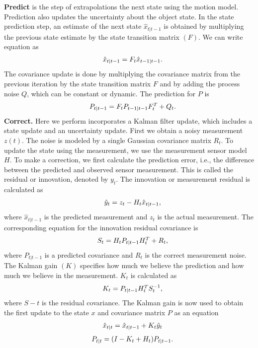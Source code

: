 \textbf{Predict} 
is the step of extrapolations the next state using the motion model. Prediction also updates the uncertainty about the object state.
In the state prediction step, an estimate of the next state $ \hat{x}_{t|t-1} $ is obtained by multiplying the previous state estimate by the state transition matrix $(F)$. We can write equation as 
\[
\begin{array}{lc}
{\rm } & {\hat{x}_{t|t-1}} = F_t \hat{x}_{t-1|t-1}.  
\end{array}
\]
The covariance update is done by multiplying the covariance matrix from the previous iteration by the state transition matrix $F$ and by adding the process noise $Q$, which can be constant or dynamic. The prediction for $P$ is
\[
\begin{array}{lc}
{\rm } & {P_{t|t-1}} = F_t P_{t-1|t-1} F_t^{T}+ Q_{t}.  
\end{array}
\]
\textbf{Correct.} Here we perform incorporates a Kalman filter update, which includes a state update and an uncertainty update. First we obtain a noisy measurement $z(t)$. The noise is modeled by a single Gaussian covariance matrix $R_t$. To update the state using the measurement, we use the measurement sensor model $H$. To make a correction, we first calculate the prediction error, i.e., the difference between the predicted and observed sensor measurement. This is called the residual or innovation, denoted by $y_t$. The innovation or measurement residual is calculated as
\[
\begin{array}{lc}
{\rm } & {\hat{y}_t = z_t - H_t \hat{x}_{t|t-1} ,} 
\end{array}
\]
where $\hat{x}_{t|t-1}$ is the predicted measurement and $z_t$ is the actual measurement. The corresponding equation for the innovation residual covariance is 
\[
\begin{array}{lc}
{\rm } & {S_t = H_t P_{t|t-1} H_t^{T} + R_t ,} 
\end{array}
\]
where $P_{t|t-1}$ is a predicted covariance and $R_t$ is the correct measurement noise. The Kalman gain $(K)$ specifies how much we believe the prediction and how much we believe in the measurement. $K_t$ is calculated as 
\[
\begin{array}{lc}
{\rm } & {K_t =  P_{t|t-1} H_t^{T}S_t^{-1} ,} 
\end{array}
\]
where $S-t$ is the residual covariance. The Kalman gain is now used to obtain the first update to the state $x$ and covariance matrix $P$ as an equation
\[
\begin{array}{lc}
{\rm } & {\hat{x}_{t|t} =  \hat{x}_{t|t-1} + K_t\hat{y}_{t}} 
\end{array}
\]
\[
\begin{array}{lc}
{\rm } & {P_{t|t} =  (I- K_t + H_t)P_{t|t-1}.} 
\end{array}
\]

